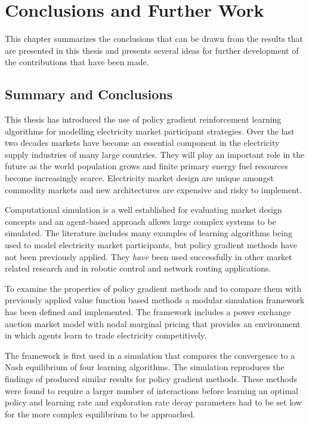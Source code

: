 \chapter{Conclusions and Further Work}
\label{ch:conclusion}
This chapter summarizes the conclusions that can be drawn from the
results that are presented in this thesis and presents several ideas for
further development of the contributions that have been made.

\section{Summary and Conclusions}
This thesis has introduced the use of policy gradient reinforcement learning
algorithms for modelling electricity market participant strategies.  Over the
last two decades markets have become an essential component in the electricity
supply industries of many large countries.  They will play an important role in
the future as the world population grows and finite primary energy fuel
resources become increasingly scarce.  Electricity market design are unique
amongst commodity markets and new architectures are expensive and risky to
implement.

Computational simulation is a well established for evaluating market design
concepts and an agent-based approach allows large complex systems to be
simulated.  The literature includes many examples of learning algorithms being
used to model electricity market participants, but policy gradient methods have
not been previously applied.  They \textit{have} been used successfully in
other market related research and in robotic control and network routing
applications.

To examine the properties of policy gradient methods and to compare them with
previously applied value function based methods a modular simulation framework
has been defined and implemented.  The framework includes a power exchange
auction market model with nodal marginal pricing that provides an environment
in which agents learn to trade electricity competitively.

The framework is first used in a simulation that compares the convergence to a
Nash equilibrium of four learning algorithms.  The simulation reproduces the
findings of  produced similar results for policy gradient
methods.  These methods were found to require a larger number of interactions
before learning an optimal policy and learning rate and exploration rate decay
parameters had to be set low for the more complex equilibrium to be approached.

